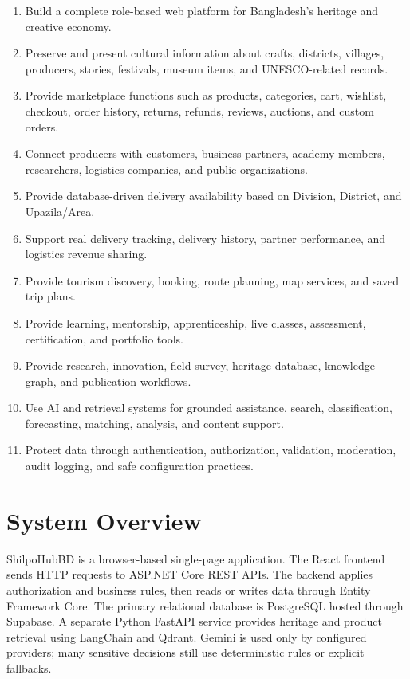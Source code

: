 \documentclass[12pt,a4paper]{report}
\begin{document}
\begin{enumerate}
  \item Build a complete role-based web platform for Bangladesh's heritage and creative economy.
  \item Preserve and present cultural information about crafts, districts, villages, producers, stories, festivals, museum items, and UNESCO-related records.
  \item Provide marketplace functions such as products, categories, cart, wishlist, checkout, order history, returns, refunds, reviews, auctions, and custom orders.
  \item Connect producers with customers, business partners, academy members, researchers, logistics companies, and public organizations.
  \item Provide database-driven delivery availability based on Division, District, and Upazila/Area.
  \item Support real delivery tracking, delivery history, partner performance, and logistics revenue sharing.
  \item Provide tourism discovery, booking, route planning, map services, and saved trip plans.
  \item Provide learning, mentorship, apprenticeship, live classes, assessment, certification, and portfolio tools.
  \item Provide research, innovation, field survey, heritage database, knowledge graph, and publication workflows.
  \item Use AI and retrieval systems for grounded assistance, search, classification, forecasting, matching, analysis, and content support.
  \item Protect data through authentication, authorization, validation, moderation, audit logging, and safe configuration practices.
\end{enumerate}

\chapter{System Overview}

ShilpoHubBD is a browser-based single-page application. The React frontend sends HTTP requests to ASP.NET Core REST APIs. The backend applies authorization and business rules, then reads or writes data through Entity Framework Core. The primary relational database is PostgreSQL hosted through Supabase. A separate Python FastAPI service provides heritage and product retrieval using LangChain and Qdrant. Gemini is used only by configured providers; many sensitive decisions still use deterministic rules or explicit fallbacks.
\end{document}
